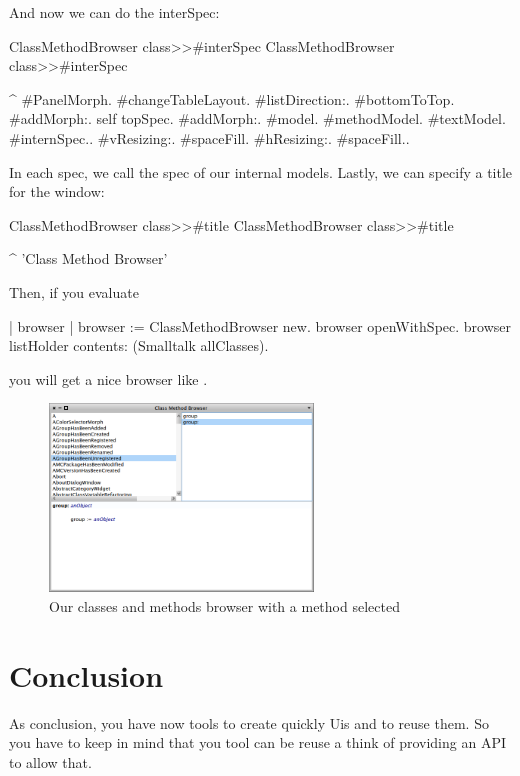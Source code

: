 \documentclass[a4paper,10pt,twoside]{book}
\begin{document}
And now we can do the interSpec:

\begin{method}{ClassMethodBrowser class>>\#interSpec}
ClassMethodBrowser class>>#interSpec

	^ { #PanelMorph.
			#changeTableLayout.
			#listDirection:. #bottomToTop.
			#addMorph:. self topSpec.
			#addMorph:. {#model. #methodModel. #textModel. #internSpec.}.
			#vResizing:. #spaceFill.
			#hResizing:. #spaceFill.}.
\end{method}
In each spec, we call the spec of our internal models.
Lastly, we can specify a title for the window:
\begin{method}{ClassMethodBrowser class>>\#title}
ClassMethodBrowser class>>#title

	^ 'Class Method Browser'
\end{method}
Then, if you evaluate

\begin{code}{}
| browser |
browser := ClassMethodBrowser new.
browser openWithSpec.
browser listHolder contents: (Smalltalk allClasses).
\end{code}
you will get a nice browser like .


\begin{figure}[ht]
\begin{center}
	\includegraphics[width=7cm]{MethodBrowser5}
	\caption{Our classes and methods browser with a method selected}
\end{center}
\end{figure}

\section{Conclusion}

As conclusion, you have now tools to create quickly Uis and to reuse them.
So you have to keep in mind that you tool can be reuse a think of providing an API to allow that.

\ifx\wholebook\relax\else
   
   
\end{document}

